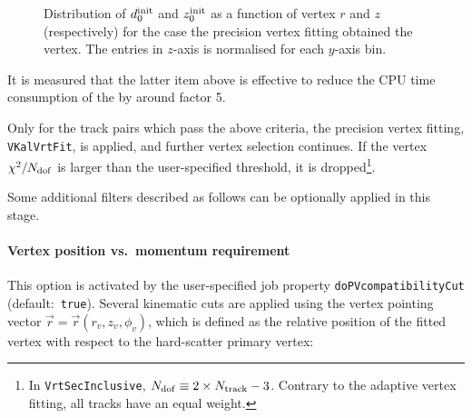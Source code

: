 \begin{figure}[t]
\begin{center}
\caption{Distribution of  $d_{0}^{\rm init}$ and  $z_{0}^{\rm init}$ as a function of vertex $r$ and $z$ (respectively) for the case the precision vertex fitting obtained the vertex. The entries in $z$-axis is normalised for each $y$-axis bin.}
\label{fig:initVertexDisp}
\end{center}
\end{figure}

It is measured that the latter item above is effective to reduce the CPU time consumption of the by around factor 5.

Only for the track pairs which pass the above criteria, the precision vertex fitting, {\tt VKalVrtFit}, is applied, and further vertex selection continues. If the vertex $\chi^{2}/N_{\rm dof}$ is larger than the user-specified threshold, it is dropped\footnote{In {\tt VrtSecInclusive}, $N_{\rm dof} \equiv 2\times N_{\rm track} - 3$. Contrary to the adaptive vertex fitting, all tracks have an equal weight.}.

\pagebreak
Some additional filters described as follows can be optionally applied in this stage.
\paragraph{Vertex position vs.~momentum requirement}
This option is activated by the user-specified job property {\tt doPVcompatibilityCut} (default:~{\tt true}). Several kinematic cuts are applied using the vertex pointing vector $\vec{r} = \vec{r}(r_{v}, z_{v},\phi_{v})$, which is defined as the relative position of the fitted vertex with respect to the hard-scatter primary vertex:

